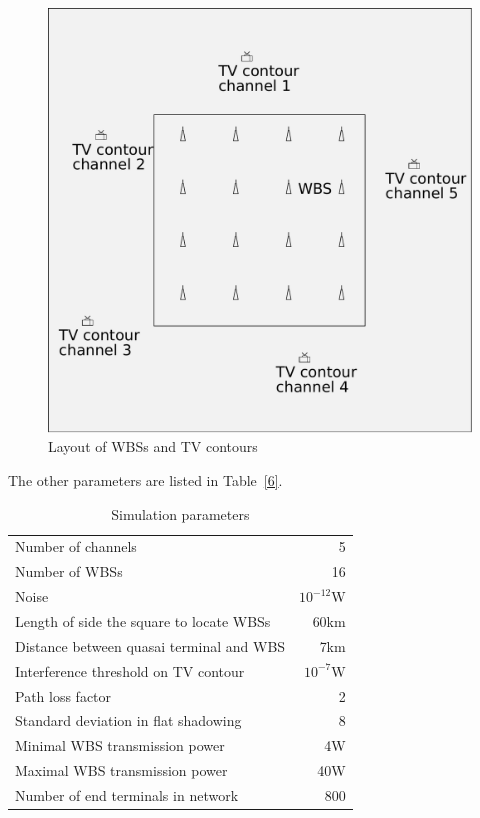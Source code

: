 \documentclass[times]{ettauth}
\theoremstyle{mytheoremstyle}
\theoremstyle{mytheoremstyle}
\theoremstyle{mytheoremstyle}
\begin{document}
\begin{figure}[h!]
  \centering
  \includegraphics[width=0.5\linewidth]{layout.pdf}
  \caption{Layout of WBSs and TV contours}
  \label{sim:layout}
\end{figure}

The other parameters are listed in Table~\ref{6}.

\begin{table}[!h]
\centering
\begin{tabular}{|l|r|}
  \hline
  Number of channels 						& 5 \\
  Number of WBSs							& 16\\
  Noise 									& $10^{-12}$W \\ %
  Length of side the square to locate WBSs		& 60km\\
  Distance between quasai terminal and WBS 	& 7km \\
  Interference threshold on TV contour 		& $10^{-7}$W \\ %
  Path loss factor 							& 2 \\
  Standard deviation in flat shadowing		& 8\\
  Minimal WBS transmission power~\footnotemark{} 			& 4W \\
  Maximal WBS transmission power 			& 40W \\
  Number of end terminals in network 		& 800 \\
  \hline
\end{tabular}
\caption{Simulation parameters}
\label{simulationparameter}
\end{table}
\end{document}
